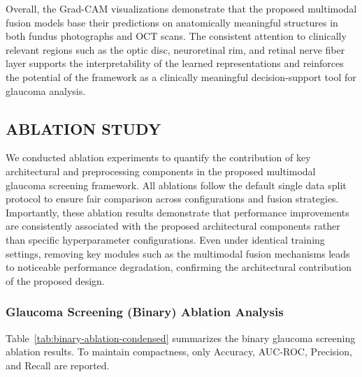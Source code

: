 \documentclass[preprint,12pt]{elsarticle}
\begin{document}
Overall, the Grad-CAM visualizations demonstrate that the proposed multimodal fusion models base their predictions on anatomically meaningful structures in both fundus photographs and OCT scans. The consistent attention to clinically relevant regions such as the optic disc, neuroretinal rim, and retinal nerve fiber layer supports the interpretability of the learned representations and reinforces the potential of the framework as a clinically meaningful decision-support tool for glaucoma analysis.


\subsection{ABLATION STUDY}

We conducted ablation experiments to quantify the contribution of key architectural and preprocessing components in the proposed multimodal glaucoma screening framework. All ablations follow the default single data split protocol to ensure fair comparison across configurations and fusion strategies.
Importantly, these ablation results demonstrate that performance improvements are consistently associated with the proposed architectural components rather than specific hyperparameter configurations. Even under identical training settings, removing key modules such as the multimodal fusion mechanisms leads to noticeable performance degradation, confirming the architectural contribution of the proposed design.

\subsubsection{Glaucoma Screening (Binary) Ablation Analysis}

Table~\ref{tab:binary-ablation-condensed} summarizes the binary glaucoma screening ablation results. To maintain compactness, only Accuracy, AUC-ROC, Precision, and Recall are reported.
\end{document}
